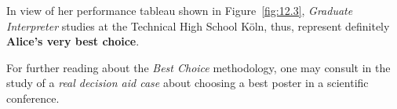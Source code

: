 In view of her performance tableau shown in Figure~\vref{fig:12.3}, \emph{Graduate Interpreter} studies at the Technical High School Köln, thus, represent definitely \textbf{Alice's very best choice}.

\vspace{\baselineskip}
For further reading about the \Rubis \emph{Best Choice} methodology, one may consult in \citet{BIS-2015bestPoster} the study of a \emph{real decision aid case} about choosing a best poster in a scientific conference.
 
%



